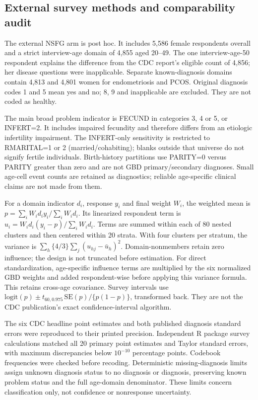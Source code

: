 \documentclass[11pt,a4paper]{article}
\begin{document}
\subsection{External survey methods and comparability audit}
The external NSFG arm is post hoc. It includes 5,586 female respondents overall and a strict interview-age domain of 4,855 aged 20--49. The one interview-age-50 respondent explains the difference from the CDC report's eligible count of 4,856; her disease questions were inapplicable. Separate known-diagnosis domains contain 4,813 and 4,801 women for endometriosis and PCOS. Original diagnosis codes 1 and 5 mean yes and no; 8, 9 and inapplicable are excluded. They are not coded as healthy.

The main broad problem indicator is FECUND in categories 3, 4 or 5, or INFERT=2. It includes impaired fecundity and therefore differs from an etiologic infertility impairment. The INFERT-only sensitivity is restricted to RMARITAL=1 or 2 (married/cohabiting); blanks outside that universe do not signify fertile individuals. Birth-history partitions use PARITY=0 versus PARITY greater than zero and are not GBD primary/secondary diagnoses. Small age-cell event counts are retained as diagnostics; reliable age-specific clinical claims are not made from them.

For a domain indicator $d_i$, response $y_i$ and final weight $W_i$, the weighted mean is $p=\sum_i W_i d_i y_i/\sum_i W_i d_i$. Its linearized respondent term is $u_i=W_i d_i(y_i-p)/\sum_i W_i d_i$. Terms are summed within each of 80 nested clusters and then centered within 20 strata. With four clusters per stratum, the variance is $\sum_h\{4/3\}\sum_j(u_{hj}-\bar u_h)^2$. Domain-nonmembers retain zero influence; the design is not truncated before estimation. For direct standardization, age-specific influence terms are multiplied by the six normalized GBD weights and added respondent-wise before applying this variance formula. This retains cross-age covariance. Survey intervals use $\mathrm{logit}(p)\pm t_{60,0.975}\,\mathrm{SE}(p)/\{p(1-p)\}$, transformed back. They are not the CDC publication's exact confidence-interval algorithm.

The six CDC headline point estimates and both published diagnosis standard errors were reproduced to their printed precision. Independent R package survey calculations matched all 20 primary point estimates and Taylor standard errors, with maximum discrepancies below $10^{-10}$ percentage points. Codebook frequencies were checked before recoding. Deterministic missing-diagnosis limits assign unknown diagnosis status to no diagnosis or diagnosis, preserving known problem status and the full age-domain denominator. These limits concern classification only, not confidence or nonresponse uncertainty.
\end{document}
